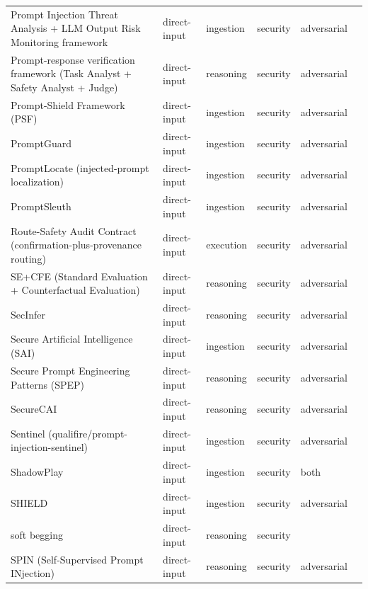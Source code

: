 \begin{longtable}{@{}>{\raggedright\arraybackslash}p{}lllll@{}}
Prompt Injection Threat Analysis + LLM Output Risk Monitoring framework & direct-input & ingestion & security & adversarial & \cite{zhao-2025-novel} \\
Prompt-response verification framework (Task Analyst + Safety Analyst + Judge) & direct-input & reasoning & security & adversarial & \cite{thota-2026-verifying} \\
Prompt-Shield Framework (PSF) & direct-input & ingestion & security & adversarial & \cite{hadiprakoso-2025-adaptive} \\
PromptGuard & direct-input & ingestion & security & adversarial & \cite{alzahrani-2026-promptguard} \\
PromptLocate (injected-prompt localization) & direct-input & ingestion & security & adversarial & \cite{jia-2025-promptlocate} \\
PromptSleuth & direct-input & ingestion & security & adversarial & \cite{wang-2025-promptsleuth} \\
Route-Safety Audit Contract (confirmation-plus-provenance routing) & direct-input & execution & security & adversarial & \cite{tai-2026-brainprompt} \\
SE+CFE (Standard Evaluation + Counterfactual Evaluation) & direct-input & reasoning & security & adversarial & \cite{liu-2025-counterfactual} \\
SecInfer & direct-input & reasoning & security & adversarial & \cite{liu-2025-secinfer} \\
Secure Artificial Intelligence (SAI) & direct-input & ingestion & security & adversarial & \cite{teckani-2025-secure} \\
Secure Prompt Engineering Patterns (SPEP) & direct-input & reasoning & security & adversarial & \cite{sudarsan-2026-secure} \\
SecureCAI & direct-input & reasoning & security & adversarial & \cite{ali-2026-securecai} \\
Sentinel (qualifire/prompt-injection-sentinel) & direct-input & ingestion & security & adversarial & \cite{ivry-2025-sentinel} \\
ShadowPlay & direct-input & ingestion & security & both & \cite{alsobeh-2025-shadowplay} \\
SHIELD & direct-input & ingestion & security & adversarial & \cite{esugo-2025-shield} \\
soft begging & direct-input & reasoning & security &  & \cite{ostermann-2024-soft} \\
SPIN (Self-Supervised Prompt INjection) & direct-input & reasoning & security & adversarial & \cite{zhou-2024-spin} \\

\end{longtable}

